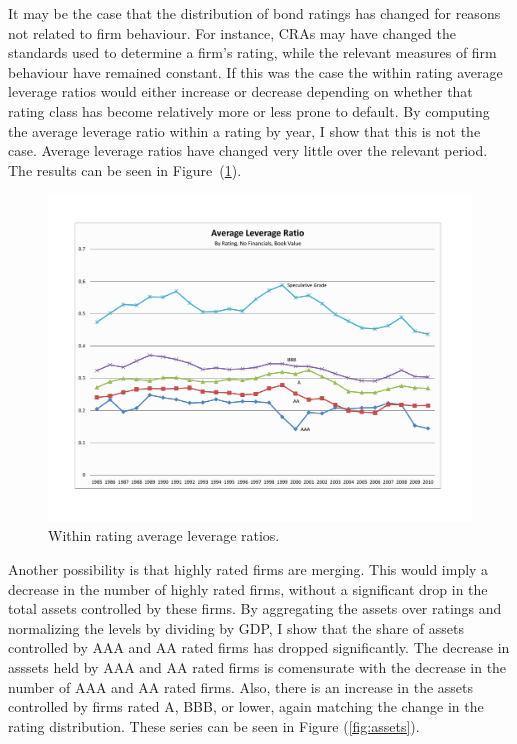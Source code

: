 \documentclass[notitlepage]{article}
\begin{document}
It may be the case that the distribution of bond ratings has changed for reasons not related to firm behaviour. For instance, CRAs may have changed the standards used to determine a firm's rating, while the relevant measures of firm behaviour have remained constant. If this was the case the within rating average leverage ratios would either increase or decrease depending on whether that rating class has become relatively more or less prone to default. By computing the average leverage ratio within a rating by year, I show that this is not the case. Average leverage ratios have changed very little over the relevant period. The results can be seen in Figure~(\ref{fig:avg_lev}). 

\begin{figure}[ht]
\centering
	\includegraphics[width=\textwidth]{avg_leverage_bv_nofin.pdf}
	\caption{Within rating average leverage ratios.}
	\label{fig:avg_lev}
\end{figure}

Another possibility is that highly rated firms are merging. This would imply a decrease in the number of highly rated firms, without a significant drop in the total assets controlled by these firms. By aggregating the assets over ratings and normalizing the levels by dividing by GDP, I show that the share of assets controlled by AAA and AA rated firms has dropped significantly. The decrease in asssets held by AAA and AA rated firms is comensurate with the decrease in the number of AAA and AA rated firms. Also, there is an increase in the assets controlled by firms rated A, BBB, or lower, again matching the change in the rating distribution. These series can be seen in Figure (\ref{fig:assets}). 
\end{document}
